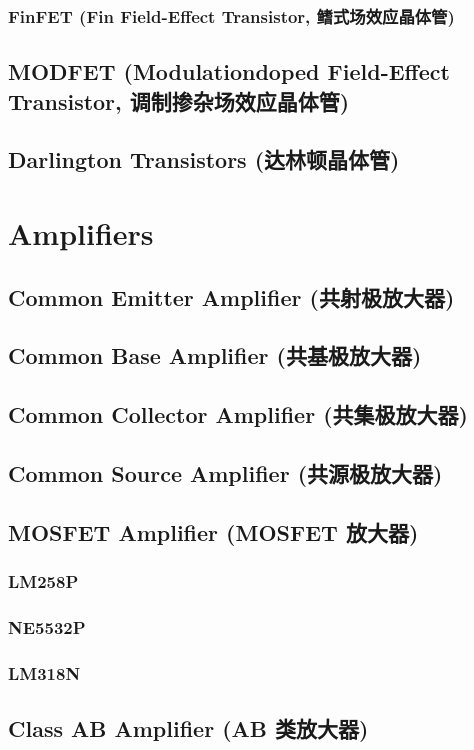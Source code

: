 \documentclass[UTF8]{report}
\begin{document}
\subsection{FinFET (Fin Field-Effect Transistor, 鳍式场效应晶体管)}

\section{MODFET (Modulationdoped Field-Effect Transistor, 调制掺杂场效应晶体管) }
\section{Darlington Transistors (达林顿晶体管)}

\chapter{Amplifiers}\thispagestyle{fancy}
\section{Common Emitter Amplifier (共射极放大器)}
\section{Common Base Amplifier (共基极放大器)}
\section{Common Collector Amplifier (共集极放大器)}
\section{Common Source Amplifier (共源极放大器)}
\section{MOSFET Amplifier (MOSFET 放大器)}

\subsection{LM258P}
\subsection{NE5532P}
\subsection{LM318N}

\section{Class AB Amplifier (AB 类放大器)}

\chapter{}\thispagestyle{fancy}
\end{document}
